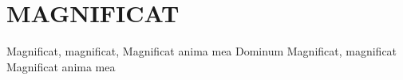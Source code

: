\documentclass[../../../songbook.tex]{subfiles}
\begin{document}
\TabPositions{8cm} %
\section*{MAGNIFICAT}
\vspace{0.5cm}

Magnificat, magnificat,			 \newline
Magnificat anima mea Dominum	\newline
Magnificat, magnificat			\newline
Magnificat anima mea			\newline
\end{document}
